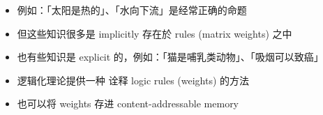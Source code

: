 \documentclass[16pt]{beamer}
\newcommand{\cc}[2]{#1}
\newcommand{\cc}[2]{#2}
\begin{document}
\begin{frame}[plain]
\begin{itemize}
	\item \cc{例如：「太阳是热的」、「水向下流」是经常正确的命题}{Eg. ``The sun is hot'', ``Water flows downhill'' are facts that stay constant}

	\item \cc{
	但这些知识很多是 implicitly 存在於 rules (matrix weights) 之中}{
	But some of this knowledge is implicitly stored as rules (matrix weights)
	}
	
	\item \cc{
	也有些知识是 explicit 的，例如：「猫是哺乳类动物」、「吸烟可以致癌」}{
	Some knowledge is explicit, eg: ``cats are mammals'', ``Smoking can cause cancer''
	}
	
	\item \cc{
	逻辑化理论提供一种 诠释 logic rules (weights) 的方法}{
	Logicalization provides a way to interpret logic rules (weights)
	}
	
	\item \cc{
	也可以将 weights 存进 content-addressable memory}{
	We can also store rules (weights) into content-addressable memory
	}
\end{itemize}
\end{frame}
\end{document}
